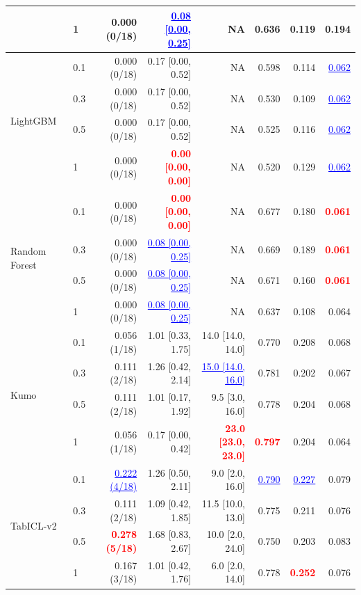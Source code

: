 \begin{table}[pos=!htbp,align=\centering]
{\begin{tabular}{llrrrrrr}
 & 1 & 0.000 (0/18) & \textcolor{blue}{\underline{0.08 [0.00, 0.25]}} & NA & 0.636 & 0.119 & 0.194 \\
\midrule
\multirow{4}{*}{LightGBM} & 0.1 & 0.000 (0/18) & 0.17 [0.00, 0.52] & NA & 0.598 & 0.114 & \textcolor{blue}{\underline{0.062}} \\
 & 0.3 & 0.000 (0/18) & 0.17 [0.00, 0.52] & NA & 0.530 & 0.109 & \textcolor{blue}{\underline{0.062}} \\
 & 0.5 & 0.000 (0/18) & 0.17 [0.00, 0.52] & NA & 0.525 & 0.116 & \textcolor{blue}{\underline{0.062}} \\
 & 1 & 0.000 (0/18) & \textcolor{red}{\textbf{0.00 [0.00, 0.00]}} & NA & 0.520 & 0.129 & \textcolor{blue}{\underline{0.062}} \\
\midrule
\multirow{4}{*}{Random Forest} & 0.1 & 0.000 (0/18) & \textcolor{red}{\textbf{0.00 [0.00, 0.00]}} & NA & 0.677 & 0.180 & \textcolor{red}{\textbf{0.061}} \\
 & 0.3 & 0.000 (0/18) & \textcolor{blue}{\underline{0.08 [0.00, 0.25]}} & NA & 0.669 & 0.189 & \textcolor{red}{\textbf{0.061}} \\
 & 0.5 & 0.000 (0/18) & \textcolor{blue}{\underline{0.08 [0.00, 0.25]}} & NA & 0.671 & 0.160 & \textcolor{red}{\textbf{0.061}} \\
 & 1 & 0.000 (0/18) & \textcolor{blue}{\underline{0.08 [0.00, 0.25]}} & NA & 0.637 & 0.108 & 0.064 \\
\midrule
\multirow{4}{*}{Kumo} & 0.1 & 0.056 (1/18) & 1.01 [0.33, 1.75] & 14.0 [14.0, 14.0] & 0.770 & 0.208 & 0.068 \\
 & 0.3 & 0.111 (2/18) & 1.26 [0.42, 2.14] & \textcolor{blue}{\underline{15.0 [14.0, 16.0]}} & 0.781 & 0.202 & 0.067 \\
 & 0.5 & 0.111 (2/18) & 1.01 [0.17, 1.92] & 9.5 [3.0, 16.0] & 0.778 & 0.204 & 0.068 \\
 & 1 & 0.056 (1/18) & 0.17 [0.00, 0.42] & \textcolor{red}{\textbf{23.0 [23.0, 23.0]}} & \textcolor{red}{\textbf{0.797}} & 0.204 & 0.064 \\
\midrule
\multirow{4}{*}{TabICL-v2} & 0.1 & \textcolor{blue}{\underline{0.222 (4/18)}} & 1.26 [0.50, 2.11] & 9.0 [2.0, 16.0] & \textcolor{blue}{\underline{0.790}} & \textcolor{blue}{\underline{0.227}} & 0.079 \\
 & 0.3 & 0.111 (2/18) & 1.09 [0.42, 1.85] & 11.5 [10.0, 13.0] & 0.775 & 0.211 & 0.076 \\
 & 0.5 & \textcolor{red}{\textbf{0.278 (5/18)}} & 1.68 [0.83, 2.67] & 10.0 [2.0, 24.0] & 0.750 & 0.203 & 0.083 \\
 & 1 & 0.167 (3/18) & 1.01 [0.42, 1.76] & 6.0 [2.0, 14.0] & 0.778 & \textcolor{red}{\textbf{0.252}} & 0.076 \\
\bottomrule
\end{tabular}
}
\end{table}
